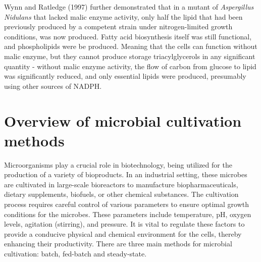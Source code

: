 Wynn and Ratledge (1997) further demonstrated that in a mutant of \textit{Aspergillus Nidulans} that lacked malic enzyme activity, 
only half the lipid that had been previously produced by a competent strain under nitrogen-limited growth 
conditions, was now produced. Fatty acid biosynthesis itself was still functional, and phospholipids were 
be produced. Meaning that the cells can function without malic enzyme, but they cannot produce 
storage triacylglycerols in any significant quantity - without malic enzyme activity, the flow of carbon from glucose to 
lipid was significantly reduced, and only essential lipids were produced, presumably using other sources of NADPH. \cite{Ratledge2002}



\section{Overview of microbial cultivation methods}



Microorganisms play a crucial role in biotechnology, being utilized for the production of a variety of bioproducts. In an industrial setting, 
these microbes are cultivated in large-scale bioreactors to manufacture biopharmaceuticals, dietary supplements, biofuels, or 
other chemical substances. The cultivation process requires careful control of various parameters to ensure optimal growth 
conditions for the microbes. These parameters include temperature, pH, oxygen levels, agitation (stirring), and pressure. It is
vital to regulate these factors to provide a conducive physical and chemical environment for the cells, thereby 
enhancing their productivity. There are three main methods for microbial cultivation: batch, fed-batch and steady-state. \cite{YangSha2019}

